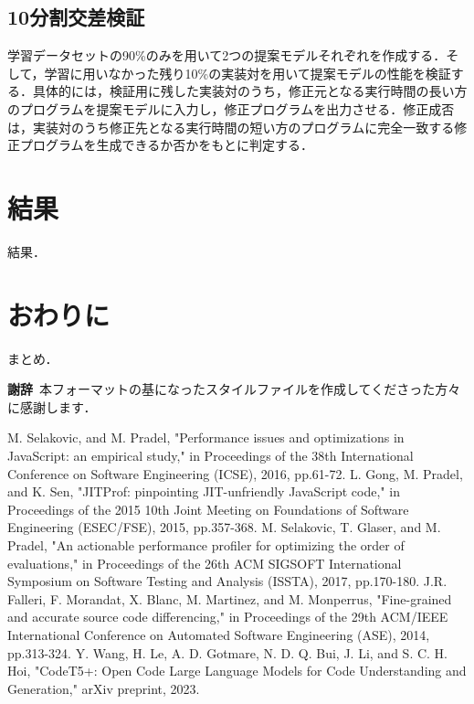 \documentclass[T,J]{fose} %
\begin{document}
\subsection{10分割交差検証}
学習データセットの90\%のみを用いて2つの提案モデルそれぞれを作成する．そして，学習に用いなかった残り10\%の実装対を用いて提案モデルの性能を検証する．具体的には，検証用に残した実装対のうち，修正元となる実行時間の長い方のプログラムを提案モデルに入力し，修正プログラムを出力させる．修正成否は，実装対のうち修正先となる実行時間の短い方のプログラムに完全一致する修正プログラムを生成できるか否かをもとに判定する．


\section{結果}
結果．


\section{おわりに}
まとめ．


\textbf{謝辞}\
本フォーマットの基になったスタイルファイルを作成してくださった方々に感謝します．





\begin{thebibliography}{9}
    M. Selakovic, and M. Pradel,
    "Performance issues and optimizations in JavaScript: an empirical study,"
    in Proceedings of the 38th International Conference on Software Engineering (ICSE),
    2016,
    pp.61-72.
    L. Gong, M. Pradel, and K. Sen,
    "JITProf: pinpointing JIT-unfriendly JavaScript code,"
    in Proceedings of the 2015 10th Joint Meeting on Foundations of Software Engineering (ESEC/FSE),
    2015,
    pp.357-368.
    M. Selakovic, T. Glaser, and M. Pradel,
    "An actionable performance profiler for optimizing the order of evaluations,"
    in Proceedings of the 26th ACM SIGSOFT International Symposium on Software Testing and Analysis (ISSTA),
    2017,
    pp.170-180.
    J.R. Falleri, F. Morandat, X. Blanc, M. Martinez, and M. Monperrus,
    "Fine-grained and accurate source code differencing,"
    in Proceedings of the 29th ACM/IEEE International Conference on Automated Software Engineering (ASE),
    2014,
    pp.313-324.
    Y. Wang, H. Le, A. D. Gotmare, N. D. Q. Bui, J. Li, and S. C. H. Hoi,
    "CodeT5+: Open Code Large Language Models for Code Understanding and Generation,"
    arXiv preprint,
    2023.
\end{thebibliography}

\end{document}
